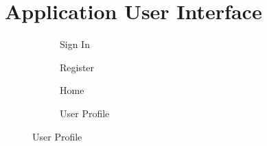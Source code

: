 \section{Application User Interface}\label{appendix:appScreens}
\begin{figure}[!htbp]
    \centering
    \noindent\begin{subfigure}[b]{0.23\textwidth}
        \centering
        \caption{Sign In}
    \end{subfigure}
    \hspace{0.5em}
    \noindent\begin{subfigure}[b]{0.23\textwidth}
        \centering
        \caption{Register}
    \end{subfigure}
    \hspace{0.5em}
    \noindent\begin{subfigure}[b]{0.23\textwidth}
        \centering
        \caption{Home}
    \end{subfigure}
    \hspace{0.5em}
    \noindent\begin{subfigure}[b]{0.23\textwidth}
        \centering
        \caption{User Profile}
    \end{subfigure}
    \end{figure}
    \FloatBarrier
